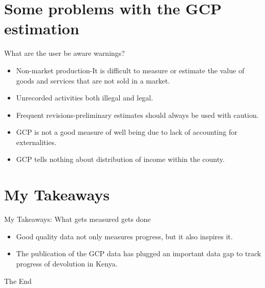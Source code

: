 \documentclass{beamer}
\begin{document}
\section{Some problems with the GCP estimation}
\begin{frame}{What are the user be aware warnings?}
    \begin{itemize}
        \item Non-market production-It is difficult to measure or estimate the value of goods and services that are not sold in a market.
        \item Unrecorded activities both illegal and legal.
        \item Frequent revisions-preliminary estimates should always be used with caution.
        \item GCP is not a good measure of well being due to lack of accounting for externalities.
        \item GCP tells nothing about distribution of income within the county.
    \end{itemize}
\end{frame}

\section{My Takeaways}
\begin{frame}{My Takeaways: What gets measured gets done}
  \begin{itemize}
    \item Good quality data not only measures progress, but it also inspires it.
    \item The publication of the GCP data has plugged an important data gap to track progress of devolution in Kenya. 
 \end{itemize}
\end{frame}

\begin{frame}
\Huge{\centerline{The End}}
\end{frame}
\end{document}
